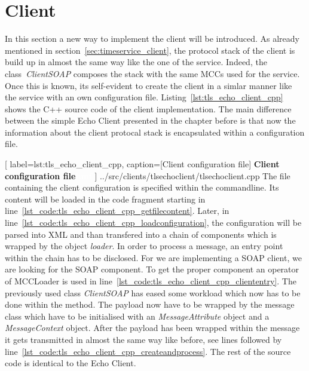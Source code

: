 \clearpage
\section{Client}

In this section a new way to implement the client will be introduced. As already mentioned in section~\ref{sec:timeservice_client}, the protocol stack of the client is build up in almost the same way like the one of the service. Indeed, the class~\textit{ClientSOAP} composes the stack with the same MCCs used for the service. Once this is known, its self-evident to create the client in a simlar manner like the service with an own configuration file.
Listing~\ref{lst:tls_echo_client_cpp} shows the C++ source code of the client implementation. The main difference between the simple Echo Client presented in the chapter before is that now the information about the client protocal stack is encapsulated within a configuration file.

	[
	label=lst:tls_echo_client_cpp,
	caption={[Client configuration file]
	\textbf{Client configuration file\textcolor{white}{hmf}}}
	]
{../src/clients/tlsechoclient/tlsechoclient.cpp}
The file containing the client configuration is specified within the commandline. 
Its content will be loaded in the code fragment starting in line~\ref{lst_code:tls_echo_client_cpp_getfilecontent}. 
Later, in line~\ref{lst_code:tls_echo_client_cpp_loadconfiguration}, the configuration will be parsed into XML and than transfered into a chain of components which is wrapped by the object \textit{loader}. In order to process a message, an entry point within the chain has to be disclosed. For we are implementing a SOAP client, we are looking for the SOAP component. 
To get the proper component an operator of MCCLoader is used in line~\ref{lst_code:tls_echo_client_cpp_cliententry}.
The previously used class \textit{ClientSOAP} has eased some workload which now has to be done within the method.
The payload now have to be wrapped by the message class which have to be initialised with an \textit{MessageAttribute} object and a \textit{MessageContext} object. After the payload has been wrapped within the message it gets transmitted in almost the same way like before, see lines followed by line~\ref{lst_code:tls_echo_client_cpp_createandprocess}. The rest of the source code is identical to the Echo Client.\\











